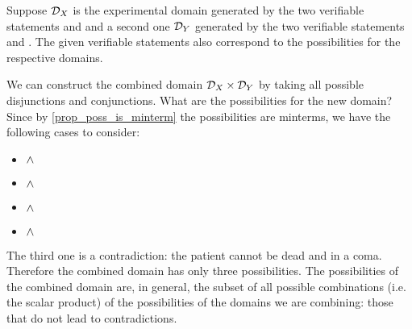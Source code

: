 \documentclass[11pt,letterpaper,fleqn]{memoir} %
\begin{document}
Suppose $\mathcal{D}_X$ is the experimental domain generated by the two verifiable statements  and  and a second one $\mathcal{D}_Y$ generated by the two verifiable statements  and . The given verifiable statements also correspond to the possibilities for the respective domains.

We can construct the combined domain $\mathcal{D}_X \times \mathcal{D}_Y$ by taking all possible disjunctions and conjunctions. What are the possibilities for the new domain? Since by \ref{prop_poss_is_minterm} the possibilities are minterms, we have the following cases to consider:
\begin{itemize}
	\item {} $\wedge$ 
	\item {} $\wedge$ 
	\item {} $\wedge$ 
	\item {} $\wedge$ 
\end{itemize}
The third one is a contradiction: the patient cannot be dead and in a coma. Therefore the combined domain has only three possibilities. The possibilities of the combined domain are, in general, the subset of all possible combinations (i.e. the scalar product) of the possibilities of the domains we are combining: those that do not lead to contradictions.
\end{document}
